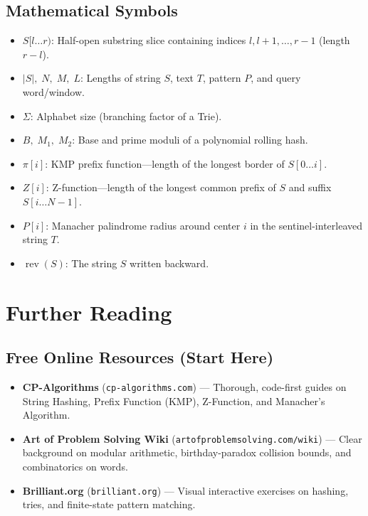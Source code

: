\documentclass[11pt,a4paper]{article}
\theoremstyle{definition}
\newcounter{exercise}
\begin{document}
\subsection*{Mathematical Symbols}
\begin{itemize}
    \item $S[l \dots r)$: Half-open substring slice containing indices $l, l + 1, \dots, r - 1$ (length $r - l$).
    \item $|S|,\; N,\; M,\; L$: Lengths of string $S$, text $T$, pattern $P$, and query word/window.
    \item $\Sigma$: Alphabet size (branching factor of a Trie).
    \item $B,\; M_1,\; M_2$: Base and prime moduli of a polynomial rolling hash.
    \item $\pi[i]$: KMP prefix function---length of the longest border of $S[0 \dots i]$.
    \item $Z[i]$: Z-function---length of the longest common prefix of $S$ and suffix $S[i \dots N - 1]$.
    \item $P[i]$: Manacher palindrome radius around center $i$ in the sentinel-interleaved string $T$.
    \item $\operatorname{rev}(S)$: The string $S$ written backward.
\end{itemize}

\section{Further Reading}

\subsection*{Free Online Resources (Start Here)}
\begin{itemize}
    \item \textbf{CP-Algorithms} (\texttt{cp-algorithms.com}) --- Thorough, code-first guides on String Hashing, Prefix Function (KMP), Z-Function, and Manacher's Algorithm.
    \item \textbf{Art of Problem Solving Wiki} (\texttt{artofproblemsolving.com/wiki}) --- Clear background on modular arithmetic, birthday-paradox collision bounds, and combinatorics on words.
    \item \textbf{Brilliant.org} (\texttt{brilliant.org}) --- Visual interactive exercises on hashing, tries, and finite-state pattern matching.
\end{itemize}
\end{document}
